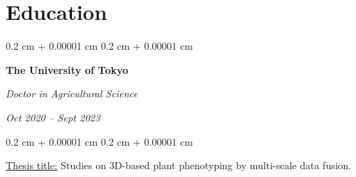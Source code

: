 \documentclass[10pt, a4paper]{article}
\newenvironment{highlights}{
    \begin{itemize}[
        topsep=0.10 cm,
        parsep=0.10 cm,
        partopsep=0pt,
        itemsep=0pt,
        leftmargin=0.4 cm + 10pt
    ]
}{
    \end{itemize}
} %
\newenvironment{onecolentry}{
    \begin{adjustwidth}{
        0.2 cm + 0.00001 cm
    }{
        0.2 cm + 0.00001 cm
    }
}{
    \end{adjustwidth}
} %
\newenvironment{twocolentry}[2][]{
    \onecolentry
    \def\secondColumn{#2}
    \setcolumnwidth{\fill, 4.5 cm}
    \begin{paracol}{2}
}{
    \switchcolumn \raggedleft \secondColumn
    \end{paracol}
    \endonecolentry
} %
\let\hrefWithoutArrow\href
\renewcommand{\href}[2]{\hrefWithoutArrow{#1}{\ifthenelse{\equal{#2}{}}{ }{#2 }\raisebox{.15ex}{\footnotesize \faExternalLink*}}}
\begin{document}
            



    \section{Education}
        
        \begin{twocolentry}{
            \textit{Oct 2020 – Sept 2023}}
            \textbf{The University of Tokyo}

            \textit{Doctor in Agricultural Science}
        \end{twocolentry}

        \vspace{0.10 cm}
        \begin{onecolentry}
            \underline{Thesis title:} Studies on 3D-based plant phenotyping by multi-scale data fusion.
        \end{onecolentry}


\end{document}

